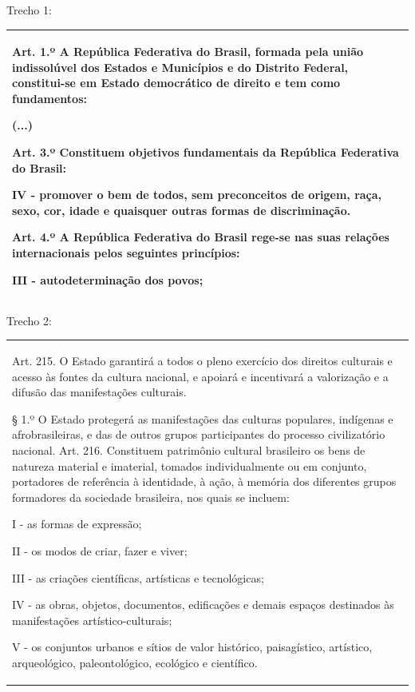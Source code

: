 {Trecho 1:

\begin{longtable}[]{@{}
  >{\raggedright\arraybackslash}p{}@{}}
\toprule
\endhead
Art. 1.º A República Federativa do Brasil, formada pela união
indissolúvel dos Estados e Municípios e do Distrito Federal,
constitui-se em Estado democrático de direito e tem como fundamentos:

(...)

Art. 3.º Constituem objetivos fundamentais da República Federativa do
Brasil:

IV - promover o bem de todos, sem preconceitos de origem, raça, sexo,
cor, idade e quaisquer outras formas de discriminação.

Art. 4.º A República Federativa do Brasil rege-se nas suas relações
internacionais pelos seguintes princípios:

III - autodeterminação dos povos; \\
\bottomrule
\end{longtable}

Trecho 2:

\begin{longtable}[]{@{}
  >{\raggedright\arraybackslash}p{}@{}}
\toprule
\endhead
Art. 215. O Estado garantirá a todos o pleno exercício dos direitos
culturais e acesso às fontes da cultura nacional, e apoiará e
incentivará a valorização e a difusão das manifestações culturais.

§ 1.º O Estado protegerá as manifestações das culturas populares,
indígenas e afrobrasileiras, e das de outros grupos participantes do
processo civilizatório nacional. Art. 216. Constituem patrimônio
cultural brasileiro os bens de natureza material e imaterial, tomados
individualmente ou em conjunto, portadores de referência à identidade, à
ação, à memória dos diferentes grupos formadores da sociedade
brasileira, nos quais se incluem:

I - as formas de expressão;

II - os modos de criar, fazer e viver;

III - as criações científicas, artísticas e tecnológicas;

IV - as obras, objetos, documentos, edificações e demais espaços
destinados às manifestações artístico-culturais;

V - os conjuntos urbanos e sítios de valor histórico, paisagístico,
artístico, arqueológico, paleontológico, ecológico e científico.


\end{longtable}}
